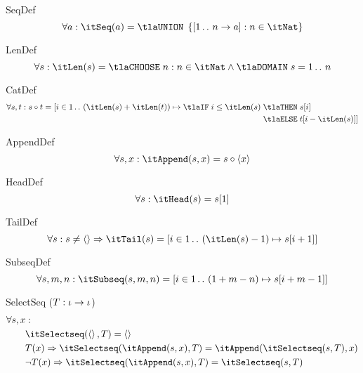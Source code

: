 \documentclass[11pt, a4paper, oneside]{article}
\begin{document}
\begin{axioms}
\item[SeqDef] \[
        \forall a : \itSeq(a) = \tlaUNION\; \st{ \bx{ 1 \ltwodots n \arr a } : n \in \itNat }
    \]

\item[LenDef] \[
        \forall s : \itLen(s) = \tlaCHOOSE\; n : n \in \itNat \wedge \tlaDOMAIN\; s = 1 \ltwodots n
    \]

\item[CatDef] \[
        \forall s, t : s \circ t = [ i \in 1 \ltwodots (\itLen(s) + \itLen(t)) \mapsto \tlaIF\; i \le \itLen(s) \;\begin{aligned}[t]
            &\tlaTHEN\; s\!\bx{i} \\
            &\tlaELSE\; t\!\bx{i - \itLen(s)} ]
        \end{aligned}
    \]

\item[AppendDef] \[
        \forall s, x : \itAppend(s, x) = s \circ \tup{ x }
    \]

\item[HeadDef] \[
        \forall s : \itHead(s) = s\!\bx{1}
    \]

\item[TailDef] \[
        \forall s : s \neq \tup{} \imp \itTail(s) = \bx{ i \in 1 \ltwodots (\itLen(s) - 1) \mapsto s\!\bx{i + 1} }
    \]

\item[SubseqDef] \[
        \forall s, m, n : \itSubseq(s, m, n) = \bx{ i \in 1 \ltwodots (1 + m - n) \mapsto s\!\bx{i + m - 1} }
    \]

\item[SelectSeq ($T : \iota \rightarrow \iota$)] \[
        \begin{aligned}
            &\forall s, x : \\
            &\qquad \itSelectseq(\tup{}, T) = \tup{} \\
            &\qquad T(x) \imp \itSelectseq(\itAppend(s, x), T) = \itAppend(\itSelectseq(s, T), x) \\
            &\qquad \neg T(x) \imp \itSelectseq(\itAppend(s, x), T) = \itSelectseq(s, T)
        \end{aligned}
    \]

\end{axioms}
\end{document}
